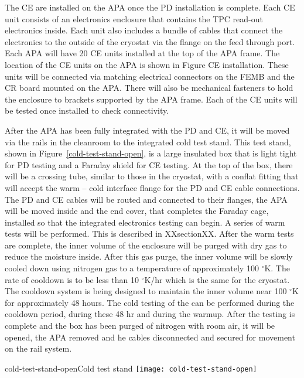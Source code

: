 The CE are installed on the APA once the PD installation is complete.  Each CE unit consists of an electronics enclosure that contains the TPC read-out electronics inside.  Each unit also includes a bundle of cables that connect the electronics to the outside of the cryostat via the flange on the feed through port.  Each APA will have 20 CE units installed at the top of the APA frame.  The location of the CE units on the APA is shown in Figure CE installation.  These units will be connected via matching electrical connectors on the FEMB and the CR board mounted on the APA.  There will also be mechanical fasteners to hold the enclosure to brackets supported by the APA frame.  Each of the CE units will be tested once installed to check connectivity.  

After the APA has been fully integrated with the PD and CE, it will be moved via the rails in the cleanroom to the integrated cold test stand.  This test stand, shown in Figure~\ref{cold-test-stand-open}, is a large insulated box that is light tight for PD testing and a Faraday shield for CE testing.  At the top of the box, there will be a crossing tube, similar to those in the cryostat, with a conflat fitting that will accept the warm – cold interface flange for the PD and CE cable connections.  The PD and CE cables will be routed and connected to their flanges, the APA will be moved inside and the end cover, that completes the Faraday cage, installed so that the integrated electronics testing can begin.  A series of warm tests will be performed.  This is described in XXsectionXX.  \fixme{}
After the warm tests are complete, the inner volume of the enclosure will be purged with dry gas to reduce the moisture inside.  After this gas purge, the inner volume will be slowly cooled down using nitrogen gas to a temperature of approximately 100 $^\circ$K.  The rate of cooldown is to be less than 10 $^\circ$K/hr which is the same for the cryostat.  The cooldown system is being designed to maintain the inner volume near 100 $^\circ$K for approximately 48 hours.  The cold testing of the can be performed during the cooldown period, during these 48 hr and during the warmup.  After the testing is complete and the box has been purged of nitrogen with room air, it will be opened, the APA removed and he cables disconnected and secured for movement on the rail system.   

\begin{cdrfigure}{cold-test-stand-open}{Cold test stand }
\texttt{[image: cold-test-stand-open]}
\end{cdrfigure}

